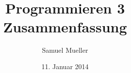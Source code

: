\documentclass{article}
\newcommand{\includeChapter}[1] {
  \newpage
  
}
\begin{document}
  \title{Programmieren 3 Zusammenfassung}
  \date{11. Januar 2014}
  \author{Samuel Mueller}
  \maketitle

  \newpage

  \tableofcontents
  \newpage

  \includeChapter{terminology}

  \includeChapter{basic_concepts}

  \includeChapter{classes}

  \includeChapter{immutability}

  \includeChapter{streams}

  \includeChapter{iterators}

  \includeChapter{containers}

  \includeChapter{algorithms}

  \includeChapter{bind}

  \includeChapter{templates}

  \includeChapter{references_and_pointers}

  \includeChapter{compile_time_calculation}

  \includeChapter{good_to_know}

  \includeChapter{appendix}
\end{document}
